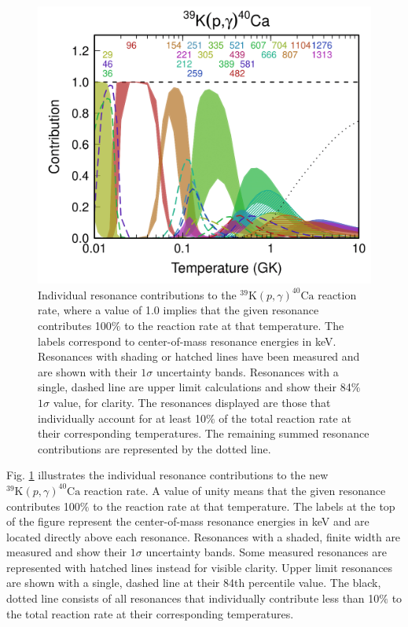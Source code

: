 \begin{figure}[!p]
\includegraphics[width=6.5in]{Chapter-6/figs/Contrib_Fox.png} %
\caption{\label{fig:contrib}Individual resonance contributions to the $^{39}\mathrm{K}(p,\gamma)^{40}\mathrm{Ca}$ reaction rate, where a value of 1.0 implies that the given resonance contributes 100$\%$ to the reaction rate at that temperature. The labels correspond to center-of-mass resonance energies in keV. Resonances with shading or hatched lines have been measured and are shown with their $1\sigma$ uncertainty bands. Resonances with a single, dashed line are upper limit calculations and show their 84$\%$ $1\sigma$ value, for clarity. The resonances displayed are those that individually account for at least 10$\%$ of the total reaction rate at their corresponding temperatures. The remaining summed resonance contributions are represented by the dotted line.}
\end{figure}

Fig. \ref{fig:contrib} illustrates the individual resonance contributions to the new $^{39}\mathrm{K}(p,\gamma)^{40}\mathrm{Ca}$ reaction rate. A value of unity means that the given resonance contributes 100$\%$ to the reaction rate at that temperature. The labels at the top of the figure represent the center-of-mass resonance energies in keV and are located directly above each resonance. Resonances with a shaded, finite width are measured and show their $1\sigma$ uncertainty bands. Some measured resonances are represented with hatched lines instead for visible clarity. Upper limit resonances are shown with a single, dashed line at their 84th percentile value. The black, dotted line consists of all resonances that individually contribute less than 10$\%$ to the total reaction rate at their corresponding temperatures.

